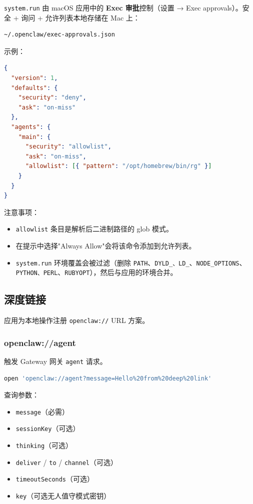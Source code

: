 \texttt{system.run} 由 macOS 应用中的 \textbf{Exec 审批}控制（设置 → Exec approvals）。安全 + 询问 + 允许列表本地存储在 Mac 上：

\begin{lstlisting}
~/.openclaw/exec-approvals.json
\end{lstlisting}


示例：

\begin{lstlisting}[language=json]
{
  "version": 1,
  "defaults": {
    "security": "deny",
    "ask": "on-miss"
  },
  "agents": {
    "main": {
      "security": "allowlist",
      "ask": "on-miss",
      "allowlist": [{ "pattern": "/opt/homebrew/bin/rg" }]
    }
  }
}
\end{lstlisting}


注意事项：

\begin{itemize}
  \item \texttt{allowlist} 条目是解析后二进制路径的 glob 模式。
  \item 在提示中选择"Always Allow"会将该命令添加到允许列表。
  \item \texttt{system.run} 环境覆盖会被过滤（删除 \texttt{PATH}、\texttt{DYLD\_\textit{}、\texttt{LD\_}}、\texttt{NODE\_OPTIONS}、\texttt{PYTHON\textit{}、\texttt{PERL}}、\texttt{RUBYOPT}），然后与应用的环境合并。
\end{itemize}


\subsection{深度链接}


应用为本地操作注册 \texttt{openclaw://} URL 方案。

\subsubsection{openclaw://agent}


触发 Gateway 网关 \texttt{agent} 请求。

\begin{lstlisting}[language=bash]
open 'openclaw://agent?message=Hello%20from%20deep%20link'
\end{lstlisting}


查询参数：

\begin{itemize}
  \item \texttt{message}（必需）
  \item \texttt{sessionKey}（可选）
  \item \texttt{thinking}（可选）
  \item \texttt{deliver} / \texttt{to} / \texttt{channel}（可选）
  \item \texttt{timeoutSeconds}（可选）
  \item \texttt{key}（可选无人值守模式密钥）
\end{itemize}


